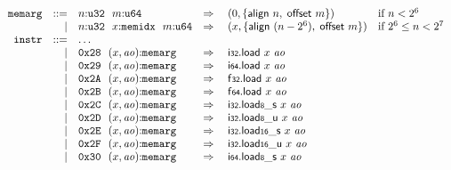 $$
\begin{array}[t]{@{}lrrl@{}l@{}l@{}l@{}}
& {\mathtt{memarg}} & ::= & n{:}{\mathtt{u32}}~~m{:}{\mathtt{u64}} & \quad\Rightarrow\quad{} & (0, \{ \mathsf{align}~n,\;\allowbreak \mathsf{offset}~m \}) & \quad \mbox{if}~ n < {2^{6}} \\
& & | & n{:}{\mathtt{u32}}~~x{:}{\mathtt{memidx}}~~m{:}{\mathtt{u64}} & \quad\Rightarrow\quad{} & (x, \{ \mathsf{align}~(n - {2^{6}}),\;\allowbreak \mathsf{offset}~m \}) & \quad \mbox{if}~ {2^{6}} \leq n < {2^{7}} \\
& {\mathtt{instr}} & ::= & \dots \\
& & | & \mathtt{0x28}~~(x, {\mathit{ao}}){:}{\mathtt{memarg}} & \quad\Rightarrow\quad{} & \mathsf{i{\scriptstyle 32}}{.}\mathsf{load}~x~{\mathit{ao}} \\
& & | & \mathtt{0x29}~~(x, {\mathit{ao}}){:}{\mathtt{memarg}} & \quad\Rightarrow\quad{} & \mathsf{i{\scriptstyle 64}}{.}\mathsf{load}~x~{\mathit{ao}} \\
& & | & \mathtt{0x2A}~~(x, {\mathit{ao}}){:}{\mathtt{memarg}} & \quad\Rightarrow\quad{} & \mathsf{f{\scriptstyle 32}}{.}\mathsf{load}~x~{\mathit{ao}} \\
& & | & \mathtt{0x2B}~~(x, {\mathit{ao}}){:}{\mathtt{memarg}} & \quad\Rightarrow\quad{} & \mathsf{f{\scriptstyle 64}}{.}\mathsf{load}~x~{\mathit{ao}} \\
& & | & \mathtt{0x2C}~~(x, {\mathit{ao}}){:}{\mathtt{memarg}} & \quad\Rightarrow\quad{} & {\mathsf{i{\scriptstyle 32}}{.}\mathsf{load}}{{\mathsf{{\scriptstyle 8}}}{\mathsf{\_}}{\mathsf{s}}}~x~{\mathit{ao}} \\
& & | & \mathtt{0x2D}~~(x, {\mathit{ao}}){:}{\mathtt{memarg}} & \quad\Rightarrow\quad{} & {\mathsf{i{\scriptstyle 32}}{.}\mathsf{load}}{{\mathsf{{\scriptstyle 8}}}{\mathsf{\_}}{\mathsf{u}}}~x~{\mathit{ao}} \\
& & | & \mathtt{0x2E}~~(x, {\mathit{ao}}){:}{\mathtt{memarg}} & \quad\Rightarrow\quad{} & {\mathsf{i{\scriptstyle 32}}{.}\mathsf{load}}{{\mathsf{{\scriptstyle 16}}}{\mathsf{\_}}{\mathsf{s}}}~x~{\mathit{ao}} \\
& & | & \mathtt{0x2F}~~(x, {\mathit{ao}}){:}{\mathtt{memarg}} & \quad\Rightarrow\quad{} & {\mathsf{i{\scriptstyle 32}}{.}\mathsf{load}}{{\mathsf{{\scriptstyle 16}}}{\mathsf{\_}}{\mathsf{u}}}~x~{\mathit{ao}} \\
& & | & \mathtt{0x30}~~(x, {\mathit{ao}}){:}{\mathtt{memarg}} & \quad\Rightarrow\quad{} & {\mathsf{i{\scriptstyle 64}}{.}\mathsf{load}}{{\mathsf{{\scriptstyle 8}}}{\mathsf{\_}}{\mathsf{s}}}~x~{\mathit{ao}} \\

\end{array}$$
